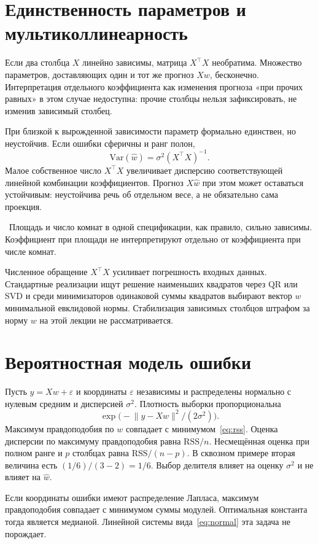\documentclass[11pt,a4paper]{article}
\newcommand{\Ex}{\par\noindent{\color{navy}\textbf{Пример.}}\ }
\begin{document}
\section{Единственность параметров и мультиколлинеарность}

Если два столбца \(X\) линейно зависимы, матрица \(X^{\top}X\) необратима. Множество параметров, доставляющих один и тот же прогноз \(Xw\), бесконечно. Интерпретация отдельного коэффициента как изменения прогноза «при прочих равных» в этом случае недоступна: прочие столбцы нельзя зафиксировать, не изменив зависимый столбец.

При близкой к вырожденной зависимости параметр формально единствен, но неустойчив. Если ошибки сферичны и ранг полон,
\[
\mathrm{Var}(\hat w)=\sigma^{2}(X^{\top}X)^{-1}.
\]
Малое собственное число \(X^{\top}X\) увеличивает дисперсию соответствующей линейной комбинации коэффициентов. Прогноз \(X\hat w\) при этом может оставаться устойчивым: неустойчива речь об отдельном весе, а не обязательно сама проекция.

\Ex Площадь и число комнат в одной спецификации, как правило, сильно зависимы. Коэффициент при площади не интерпретируют отдельно от коэффициента при числе комнат.

Численное обращение \(X^{\top}X\) усиливает погрешность входных данных. Стандартные реализации ищут решение наименьших квадратов через QR или SVD и среди минимизаторов одинаковой суммы квадратов выбирают вектор \(w\) минимальной евклидовой нормы. Стабилизация зависимых столбцов штрафом за норму \(w\) на этой лекции не рассматривается.

\section{Вероятностная модель ошибки}

Пусть \(y=Xw+\varepsilon\) и координаты \(\varepsilon\) независимы и распределены нормально с нулевым средним и дисперсией \(\sigma^{2}\). Плотность выборки пропорциональна
\[
\exp\bigl(-\lVert y-Xw\rVert^{2}/(2\sigma^{2})\bigr).
\]
Максимум правдоподобия по \(w\) совпадает с минимумом~\eqref{eq:rss}. Оценка дисперсии по максимуму правдоподобия равна \(\mathrm{RSS}/n\). Несмещённая оценка при полном ранге и \(p\) столбцах равна \(\mathrm{RSS}/(n-p)\). В сквозном примере вторая величина есть \((1/6)/(3-2)=1/6\). Выбор делителя влияет на оценку \(\sigma^{2}\) и не влияет на \(\hat w\).

Если координаты ошибки имеют распределение Лапласа, максимум правдоподобия совпадает с минимумом суммы модулей. Оптимальная константа тогда является медианой. Линейной системы вида~\eqref{eq:normal} эта задача не порождает.
\end{document}
